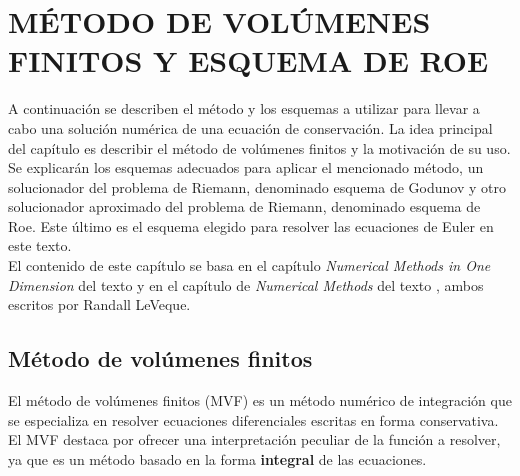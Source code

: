 \chapter{MÉTODO DE VOLÚMENES FINITOS Y ESQUEMA DE ROE}
\label{cap:2}
A continuación se describen el método y los esquemas a utilizar para llevar a cabo una solución numérica de una ecuación de conservación. La idea principal del capítulo es describir el método de volúmenes finitos y la motivación de su uso. Se explicarán los esquemas adecuados para aplicar el mencionado método, un solucionador del problema de Riemann, denominado esquema de Godunov y otro solucionador aproximado del problema de Riemann, denominado esquema de Roe. Este último es el esquema elegido para resolver las ecuaciones de Euler en este texto.\\
El contenido de este capítulo se basa en el capítulo \textit{Numerical Methods in One Dimension} del texto \cite{LeVequeAstro} y en el capítulo de \textit{Numerical Methods} del texto \cite{LeVeque}, ambos escritos por Randall LeVeque.

\section{Método de volúmenes finitos}
El método de volúmenes finitos (MVF) es un método numérico de integración que se especializa en resolver ecuaciones diferenciales escritas en forma conservativa. El MVF destaca por ofrecer una interpretación peculiar de la función a resolver, ya que es un método basado en la forma \textbf{integral} de las ecuaciones.
